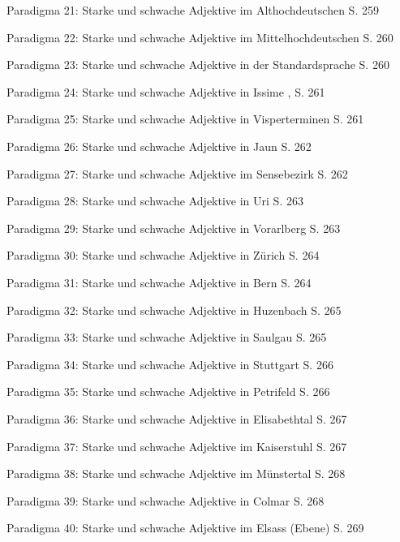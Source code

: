 Paradigma 21: Starke und schwache Adjektive im Althochdeutschen \citep[217–227]{Braune2004}  S. 259

Paradigma 22: Starke und schwache Adjektive im Mittelhochdeutschen \citep[200–203]{Paul2007}  S. 260

Paradigma 23: Starke und schwache Adjektive in der Standardsprache \citep[177–184]{Eisenberg2006}  S. 260

Paradigma 24: Starke und schwache Adjektive in Issime \citep[267–268]{Zürrer1999}, \citep[90–97]{Perinetto1981}  S. 261

Paradigma 25: Starke und schwache Adjektive in Visperterminen \citep[134–135]{Wipf1911}  S. 261

Paradigma 26: Starke und schwache Adjektive in Jaun \citep[272–275]{Stucki1917}  S. 262

Paradigma 27: Starke und schwache Adjektive im Sensebezirk \citep[190–192]{Henzen1927}  S. 262

Paradigma 28: Starke und schwache Adjektive in Uri \citep[185–187]{Clauß1929}  S. 263

Paradigma 29: Starke und schwache Adjektive in Vorarlberg \citep[261–267]{Jutz1925}  S. 263

Paradigma 30: Starke und schwache Adjektive in Zürich \citep[121–126]{Weber1987}  S. 264

Paradigma 31: Starke und schwache Adjektive in Bern \citep[117–120]{Marti1985}  S. 264

Paradigma 32: Starke und schwache Adjektive in Huzenbach \citep[98–99]{Baur1967}  S. 265

Paradigma 33: Starke und schwache Adjektive in Saulgau \citep[109–113]{Raichle1932}  S. 265

Paradigma 34: Starke und schwache Adjektive in Stuttgart \citep[157–159]{Frey1975}  S. 266

Paradigma 35: Starke und schwache Adjektive in Petrifeld \citep[62–63]{Moser1937}  S. 266

Paradigma 36: Starke und schwache Adjektive in Elisabethtal \citep[52]{Žirmunskij1928/29}  S. 267

Paradigma 37: Starke und schwache Adjektive im Kaiserstuhl \citep[407–410]{Noth1993}  S. 267

Paradigma 38: Starke und schwache Adjektive im Münstertal \citep[44–45]{Mankel1886}  S. 268

Paradigma 39: Starke und schwache Adjektive in Colmar \citep[77–80]{Henry1900}  S. 268

Paradigma 40: Starke und schwache Adjektive im Elsass (Ebene) \citep[114–146]{Beyer1963}  S. 269


